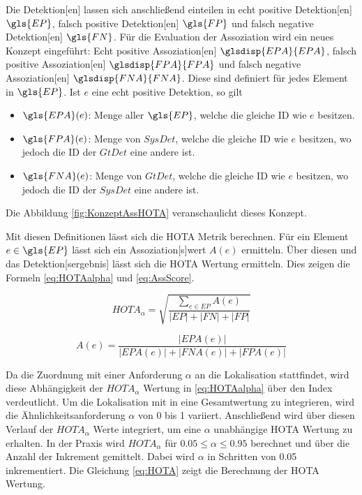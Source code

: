 Die \gls{Detektion}[en] lassen sich anschließend einteilen in echt positive \gls{Detektion}[en] \(\gls{EP}\), falsch positive \gls{Detektion}[en] \(\gls{FP}\) und falsch negative \gls{Detektion}[en] \(\gls{FN}\). Für die Evaluation der \gls{Assoziation} wird ein neues Konzept eingeführt: Echt positive \gls{Assoziation}[en] \(\glsdisp{EPA}{EPA}\), falsch positive \gls{Assoziation}[en] \(\glsdisp{FPA}{FPA}\) und falsch negative \gls{Assoziation}[en] \(\glsdisp{FNA}{FNA}\). Diese sind definiert für jedes Element in \(\gls{EP}\). Ist \(e\) eine echt positive \gls{Detektion}, so gilt

\begin{itemize}
    \item \(\gls{EPA}(e)\): Menge aller \(\gls{EP}\), welche die gleiche \acrshort{ID} wie \(e\) besitzen.
    \item \(\gls{FPA}(e)\): Menge von \(SysDet\), welche die gleiche \acrshort{ID} wie \(e\) besitzen, wo jedoch die \acrshort{ID} der \(GtDet\) eine andere ist.
    \item \(\gls{FNA}(e)\): Menge von \(GtDet\), welche die gleiche \acrshort{ID} wie \(e\) besitzen, wo jedoch die \acrshort{ID} der \(SysDet\) eine andere ist.
\end{itemize}

Die Abbildung \ref{fig:KonzeptAssHOTA} veranschaulicht dieses Konzept.
    

Mit diesen Definitionen lässt sich die \gls{HOTA} Metrik berechnen. Für ein Element \(e \in \gls{EP}\) lässt sich ein \gls{Assoziation}[s]wert \(A(e)\) ermitteln. Über diesen und das \gls{Detektion}[sergebnis] lässt sich die \gls{HOTA} Wertung ermitteln. Dies zeigen die Formeln \ref{eq:HOTAalpha} und \ref{eq:AssScore}.

\begin{equation}
    \label{eq:HOTAalpha}
    HOTA_{\alpha} = \sqrt{\frac{\sum_{e \in EP} A(e)}{|EP| + |FN| + |FP|}}
\end{equation}

\begin{equation}
    \label{eq:AssScore}
    A(e) = \frac{|EPA(e)|}{|EPA(e)| + |FNA(e)| + |FPA(e)|}
\end{equation}

Da die Zuordnung mit einer Anforderung \(\alpha\) an die \gls{Lokalisation} stattfindet, wird diese Abhängigkeit der \(HOTA_{\alpha}\) Wertung in \ref{eq:HOTAalpha} über den Index verdeutlicht. Um die \gls{Lokalisation} mit in eine Gesamtwertung zu integrieren, wird die Ähnlichkeitsanforderung \(\alpha\) von 0 bis 1 variiert. Anschließend wird über diesen Verlauf der \(HOTA_{\alpha}\) Werte integriert, um eine \(\alpha\) unabhängige \gls{HOTA} Wertung zu erhalten. In der Praxis wird \(HOTA_{\alpha}\) für \(0.05 \leq \alpha \leq 0.95\) berechnet und über die Anzahl der Inkrement gemittelt. Dabei wird \(\alpha\) in Schritten von 0.05 inkrementiert. Die Gleichung \ref{eq:HOTA} zeigt die Berechnung der \gls{HOTA} Wertung.

